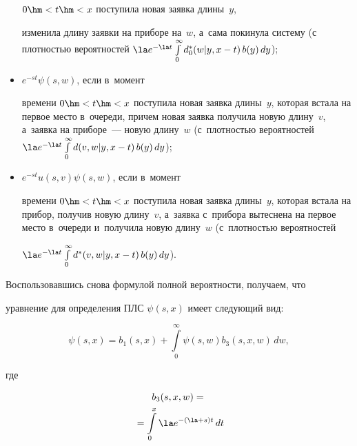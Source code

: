 \begin{multicols}{2}
\begin{itemize}
$0\hm<t\hm<x$ поступила новая заявка длины~$y$,


изменила длину заявки на приборе на~$w$, а~сама покинула систему (с плотностью вероятностей $\la e^{-\la t} \int\limits_0^\infty d^*_0(w|y,x-t)\, b(y)\, dy


$);





\item  $e^{-s t}\psi(s,w)$, если в~момент


времени $0\hm<t\hm<x$ поступила новая заявка длины~$y$, которая встала на первое место в~очереди, причем новая заявка получила новую длину~$v$, а~заявка на приборе~--- новую длину~$w$ (с~плот\-ностью вероятностей $\la e^{-\la t}


\int\limits_0^\infty d(v,w|y,x-t)\, b(y)\, dy


$);





\item  $e^{-s t}u(s,v)\psi(s,w)$, если в~момент


времени $0\hm<t\hm<x$ поступила новая заявка длины~$y$, которая встала на прибор, получив новую длину~$v$, а~заявка с~прибора вытеснена на первое место в~очереди и~получила новую длину~$w$ (с~плот\-ностью вероятностей


$\la e^{-\la t} \int\limits_0^\infty d^*(v,w|y,x-t)\, b(y)\, dy


$).


\end{itemize}





Воспользовавшись снова формулой полной вероятности, получаем, что


уравнение для определения ПЛС $\psi(s,x)$ имеет следующий вид:


\begin{equation}


\label{eq3}


\psi(s,x)= b_1(s,x)+\int\limits_0^\infty\psi(s,w) b_3(s,x,w) \, dw,


\end{equation}


где


\begin{multline*}


b_3(s,x,w) = {}\\


{}=\int\limits_0^x \la e^{-(\la+s) t}\,dt



\end{multline*}
\end{multicols}
